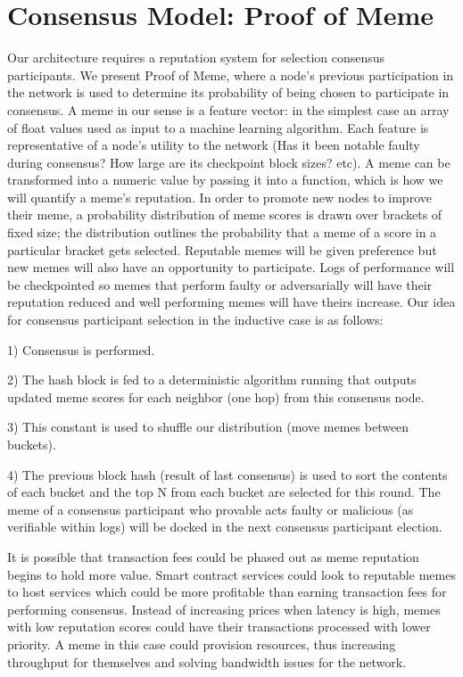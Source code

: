 \documentclass{article}
\begin{document}
\section{Consensus Model: Proof of Meme}
Our architecture requires a reputation system for selection consensus participants. We present Proof of Meme, where a node's previous participation in the network is used to determine its probability of being chosen to participate in consensus. A meme in our sense is a feature vector: in the simplest case an array of float values used as input to a machine learning algorithm. Each feature is representative of a node's utility to the network (Has it been notable faulty during consensus? How large are its checkpoint block sizes? etc). A meme can be transformed into a numeric value by passing it into a function, which is how we will quantify a meme's reputation. In order to promote new nodes to improve their meme, a probability distribution of meme scores is drawn over brackets of fixed size; the distribution outlines the probability that a meme of a score in a particular bracket gets selected. Reputable memes will be given preference but new memes will also have an opportunity to participate. Logs of performance will be checkpointed so memes that perform faulty or adversarially will have their reputation reduced and well performing memes will have theirs increase. Our idea for consensus participant selection in the inductive case is as follows:

1) Consensus is performed. 

2) The hash block is fed to a deterministic algorithm running that outputs updated meme scores for each neighbor (one hop) from this consensus node. 

3) This constant is used to shuffle our distribution (move memes between buckets). 

4) The previous block hash (result of last consensus) is used to sort the contents of each bucket and the top N from each bucket are selected for this round. The meme of a consensus participant who provable acts faulty or malicious (as verifiable within logs) will be docked in the next consensus participant election.

It is possible that transaction fees could be phased out as meme reputation begins to hold more value. Smart contract services could look to reputable memes to host services which could be more profitable than earning transaction fees for performing consensus. Instead of increasing prices when latency is high, memes with low reputation scores could have their transactions processed with lower priority. A meme in this case could provision resources, thus increasing throughput for themselves and solving bandwidth issues for the network. 
\end{document}
